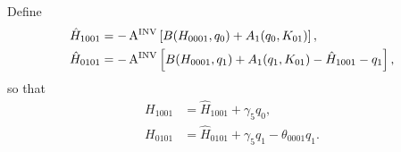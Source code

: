 Define
\begin{equation*}
\begin{aligned}
\hat H_{1001} &= -\operatorname{A^{\text{INV}}} \left[ B(H_{0001},q_0)+A_1(q_0,K_{01}) \right], \\
\hat H_{0101} &= -\operatorname{A^{\text{INV}}} \left[
				B(H_{0001},q_1)+A_1(q_1,K_{01})-\hat H_{1001}-q_1 \right], \\
\end{aligned}
\end{equation*}
so that
\begin{equation*}
\begin{aligned}
H_{1001} &= \hat H_{1001} + \gamma_5 q_0, \\
H_{0101} &= \hat H_{0101} + \gamma_5 q_1 - \theta_{0001} q_1. \\
\end{aligned}
\end{equation*}

